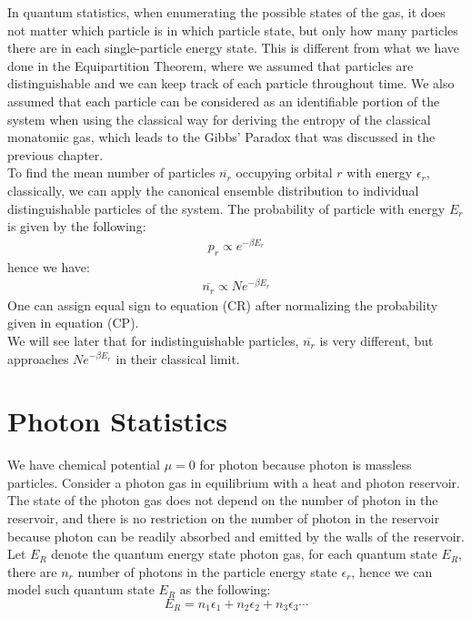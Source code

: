 \documentclass[11pt,oneside]{book}
\theoremstyle{break}
\theoremstyle{break}
\begin{document}
In quantum statistics, when enumerating the possible states of the gas, it does not matter which particle is in which particle state, but only how many particles there are in each single-particle energy state. This is different from what we have done in the Equipartition Theorem, where we assumed that particles are distinguishable and we can keep track of each particle throughout time. We also assumed that each particle can be considered as an identifiable portion of the system when using the classical way for deriving the entropy of the classical monatomic gas, which leads to the Gibbs' Paradox that was discussed in the previous chapter.\\

To find the mean number of particles $\overline{n_r}$ occupying orbital $r$ with energy $\epsilon_r$, classically, we can apply the canonical ensemble distribution to individual distinguishable particles of the system. The probability of particle with energy $E_r$ is given by the following:
\begin{align*}
p_r \propto e^{-\beta E_r} \tag{CP}
\end{align*}
hence we have:
\begin{align*}
\overline{n_r}\propto Ne^{-\beta E_r} \tag{CR}
\end{align*}
One can assign equal sign to equation (CR) after normalizing the probability given in equation (CP).\\

We will see later that for indistinguishable particles, $\overline{n_r}$ is very different, but approaches $Ne^{-\beta E_r}$ in their classical limit. \\

\section[Photon Statistics]{\color{red}Photon Statistics\color{black}}
We have chemical potential $\mu=0$ for photon because photon is massless particles. Consider a photon gas in equilibrium with a heat and photon reservoir. The state of the photon gas does not depend on the number of photon in the reservoir, and there is no restriction on the number of photon in the reservoir because photon can be readily absorbed and emitted by the walls of the reservoir. Let $E_R$ denote the quantum energy state photon gas, for each quantum state $E_R$, there are $n_r$ number of photons in the particle energy state $\epsilon_r$, hence we can model such quantum state $E_R$ as the following:
$$E_R = n_1 \epsilon_1 + n_2 \epsilon_2 + n_3 \epsilon_3\cdots $$
\end{document}
